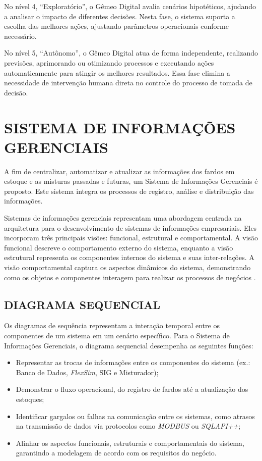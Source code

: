 \documentclass[
    12pt,                %
    openright,           %
    oneside,             %
    a4paper,             %
    english,             %
    spanish,             %
    brazil               %
]{ufscar}
\begin{document}
No nível 4, ``Exploratório'', o Gêmeo Digital avalia cenários hipotéticos, ajudando a analisar o impacto de diferentes decisões. Nesta fase, o sistema suporta a escolha das melhores ações, ajustando parâmetros operacionais conforme necessário.

No nível 5, ``Autônomo'', o Gêmeo Digital atua de forma independente, realizando previsões, aprimorando ou otimizando processos e executando ações automaticamente para atingir os melhores resultados. Essa fase elimina a necessidade de intervenção humana direta no controle do processo de tomada de decisão.

\section{SISTEMA DE INFORMAÇÕES GERENCIAIS}

A fim de centralizar, automatizar e atualizar as informações dos fardos em estoque e as misturas passadas e futuras, um Sistema de Informações Gerenciais é proposto. Este sistema integra os processos de registro, análise e distribuição das informações.

Sistemas de informações gerenciais representam uma abordagem centrada na arquitetura para o desenvolvimento de sistemas de informações empresariais. Eles incorporam três principais visões: funcional, estrutural e comportamental. A visão funcional descreve o comportamento externo do sistema, enquanto a visão estrutural representa os componentes internos do sistema e suas inter-relações. A visão comportamental captura os aspectos dinâmicos do sistema, demonstrando como os objetos e componentes interagem para realizar os processos de negócios \cite{dennis_systems_2009}.

\subsection{DIAGRAMA SEQUENCIAL}

Os diagramas de sequência representam a interação temporal entre os componentes de um sistema em um cenário específico. Para o Sistema de Informações Gerenciais, o diagrama sequencial desempenha as seguintes funções:

\begin{itemize}
    \item Representar as trocas de informações entre os componentes do sistema (ex.: Banco de Dados, \textit{FlexSim}, SIG e Misturador);
    \item Demonstrar o fluxo operacional, do registro de fardos até a atualização dos estoques;
    \item Identificar gargalos ou falhas na comunicação entre os sistemas, como atrasos na transmissão de dados via protocolos como \textit{MODBUS} ou \textit{SQLAPI++};
    \item Alinhar os aspectos funcionais, estruturais e comportamentais do sistema, garantindo a modelagem de acordo com os requisitos do negócio.
\end{itemize}
\end{document}
